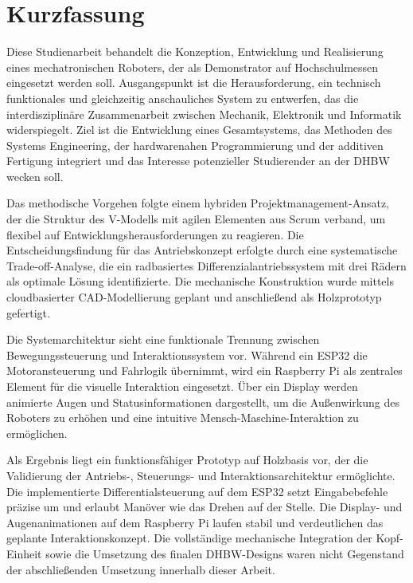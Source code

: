\chapter*{Kurzfassung} %


Diese Studienarbeit behandelt die Konzeption, Entwicklung und Realisierung eines mechatronischen Roboters, der als Demonstrator auf Hochschulmessen eingesetzt werden soll. Ausgangspunkt ist die Herausforderung, ein technisch funktionales und gleichzeitig anschauliches System zu entwerfen, das die interdisziplinäre Zusammenarbeit zwischen Mechanik, Elektronik und Informatik widerspiegelt. Ziel ist die Entwicklung eines Gesamtsystems, das Methoden des Systems Engineering, der hardwarenahen Programmierung und der additiven Fertigung integriert und das Interesse potenzieller Studierender an der DHBW wecken soll.

Das methodische Vorgehen folgte einem hybriden Projektmanagement-Ansatz, der die Struktur des V-Modells mit agilen Elementen aus Scrum verband, um flexibel auf Entwicklungsherausforderungen zu reagieren. Die Entscheidungsfindung für das Antriebskonzept erfolgte durch eine systematische Trade-off-Analyse, die ein radbasiertes Differenzialantriebssystem mit drei Rädern als optimale Lösung identifizierte. Die mechanische Konstruktion wurde mittels cloudbasierter CAD-Modellierung geplant und anschließend als Holzprototyp gefertigt.

Die Systemarchitektur sieht eine funktionale Trennung zwischen Bewegungssteuerung und Interaktionssystem vor. Während ein ESP32 die Motoransteuerung und Fahrlogik übernimmt, wird ein Raspberry Pi als zentrales Element für die visuelle Interaktion eingesetzt. Über ein Display werden animierte Augen und Statusinformationen dargestellt, um die Außenwirkung des Roboters zu erhöhen und eine intuitive Mensch-Maschine-Interaktion zu ermöglichen.

Als Ergebnis liegt ein funktionsfähiger Prototyp auf Holzbasis vor, der die Validierung der Antriebs-, Steuerungs- und Interaktionsarchitektur ermöglichte. Die implementierte Differentialsteuerung auf dem ESP32 setzt Eingabebefehle präzise um und erlaubt Manöver wie das Drehen auf der Stelle. Die Display- und Augenanimationen auf dem Raspberry Pi laufen stabil und verdeutlichen das geplante Interaktionskonzept. Die vollständige mechanische Integration der Kopf-Einheit sowie die Umsetzung des finalen DHBW-Designs waren nicht Gegenstand der abschließenden Umsetzung innerhalb dieser Arbeit.

